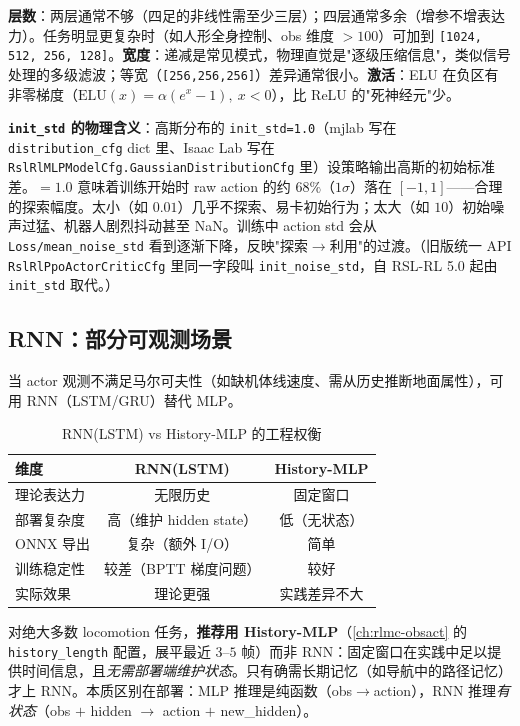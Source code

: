 \textbf{层数}：两层通常不够（四足的非线性需至少三层）；四层通常多余（增参不增表达力）。任务明显更复杂时（如人形全身控制、obs 维度 $>100$）可加到 \verb|[1024, 512, 256, 128]|。\textbf{宽度}：递减是常见模式，物理直觉是"逐级压缩信息"，类似信号处理的多级滤波；等宽（\verb|[256,256,256]|）差异通常很小。\textbf{激活}：ELU 在负区有非零梯度（$\mathrm{ELU}(x)=\alpha(e^x-1),\ x<0$），比 ReLU 的"死神经元"少。

\textbf{\texttt{init\_std} 的物理含义}：高斯分布的 \verb|init_std=1.0|（mjlab 写在 \verb|distribution_cfg| dict 里、Isaac Lab 写在 \verb|RslRlMLPModelCfg.GaussianDistributionCfg| 里）设策略输出高斯的初始标准差。$=1.0$ 意味着训练开始时 raw action 的约 $68\%$（$1\sigma$）落在 $[-1,1]$——合理的探索幅度。太小（如 $0.01$）几乎不探索、易卡初始行为；太大（如 $10$）初始噪声过猛、机器人剧烈抖动甚至 NaN。训练中 action std 会从 \verb|Loss/mean_noise_std| 看到逐渐下降，反映"探索$\to$利用"的过渡。（旧版统一 API \verb|RslRlPpoActorCriticCfg| 里同一字段叫 \verb|init_noise_std|，自 RSL-RL 5.0 起由 \verb|init_std| 取代。）

\subsection{RNN：部分可观测场景}

当 actor 观测不满足马尔可夫性（如缺机体线速度、需从历史推断地面属性），可用 RNN（LSTM/GRU）替代 MLP。

\begin{table}[H]
\centering
\caption{RNN(LSTM) vs History-MLP 的工程权衡}
\label{tab:rlmc-rnn-vs-histmlp}
\begin{tabular}{lcc}
\hline
维度 & RNN(LSTM) & History-MLP \\
\hline
理论表达力 & 无限历史 & 固定窗口 \\
部署复杂度 & 高（维护 hidden state） & 低（无状态） \\
ONNX 导出 & 复杂（额外 I/O） & 简单 \\
训练稳定性 & 较差（BPTT 梯度问题） & 较好 \\
实际效果 & 理论更强 & 实践差异不大 \\
\hline
\end{tabular}
\end{table}

\begin{insight}\label{ins:rlmc-histmlp}
对绝大多数 locomotion 任务，\textbf{推荐用 History-MLP}（\cref{ch:rlmc-obsact} 的 \verb|history_length| 配置，展平最近 $3$--$5$ 帧）而非 RNN：固定窗口在实践中足以提供时间信息，且\emph{无需部署端维护状态}。只有确需长期记忆（如导航中的路径记忆）才上 RNN。本质区别在部署：MLP 推理是纯函数（obs$\to$action），RNN 推理\emph{有状态}（obs $+$ hidden $\to$ action $+$ new\_hidden）。
\end{insight}

